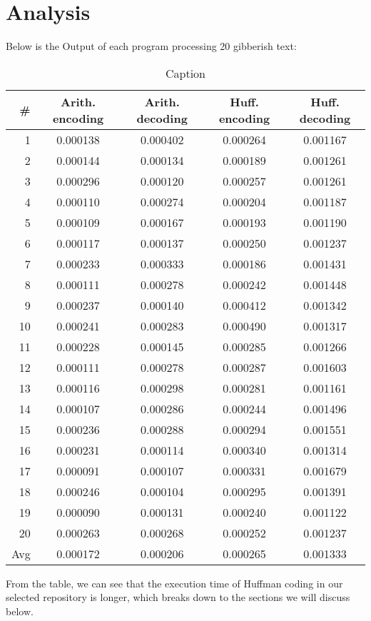 \section{Analysis}
Below is the Output of each program processing 20 gibberish text:
	\begin{table}[h]
	    \centering
	    \begin{tabular}{r|c|c|c|c}
	       \# & Arith. encoding& Arith. decoding &  Huff. encoding & Huff. decoding\\
       \hline
	       1& 0.000138 & 0.000402 &0.000264& 0.001167\\
	       2 &0.000144& 0.000134 &0.000189& 0.001261\\
	       3 &0.000296 & 0.000120 &0.000257& 0.001261\\
	       4 &0.000110& 0.000274 &0.000204& 0.001187\\
	       5 &0.000109 &0.000167  &0.000193& 0.001190\\
	       6 &0.000117& 0.000137  &0.000250&0.001237\\
	       7 &0.000233 & 0.000333 &0.000186&0.001431 \\
	       8 &  0.000111&0.000278& 0.000242&0.001448\\
	       9  & 0.000237  &0.000140&0.000412&0.001342\\
	       10 & 0.000241 &0.000283&0.000490&0.001317 \\
	       11  &0.000228 &0.000145& 0.000285&0.001266\\
	       12 & 0.000111 &0.000278& 0.000287&0.001603\\
	       13  & 0.000116 &0.000298&0.000281 &0.001161\\
	       14 & 0.000107 &0.000286&0.000244& 0.001496\\
	       15  &0.000236  &0.000288& 0.000294&0.001551\\
	       16 & 0.000231 &0.000114& 0.000340&0.001314\\
	       17  & 0.000091 &0.000107& 0.000331&0.001679\\
	       18 &  0.000246&0.000104&0.000295 &0.001391\\
	       19  &  0.000090 &0.000131&0.000240&0.001122\\
	       20 & 0.000263 &0.000268& 0.000252& 0.001237\\
	       \hline
	       Avg&0.000172 & 0.000206&0.000265& 0.001333
	    \end{tabular}
	    \caption{Caption}
	    \label{tab:my_label}
	\end{table}
	From the table, we can see that the execution time of Huffman coding in our selected repository is longer, which breaks down to the sections we will discuss below.
